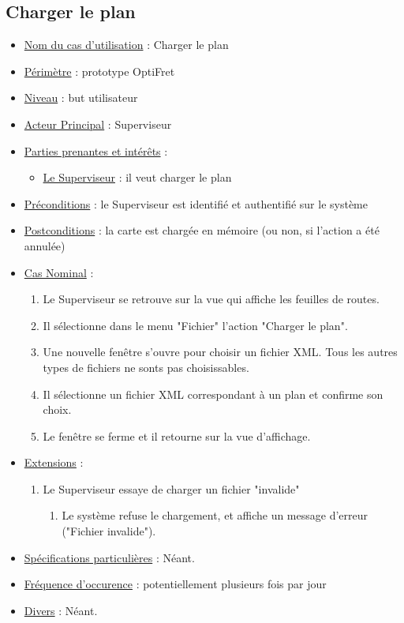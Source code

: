 \documentclass[a4paper]{report}
\begin{document}
\subsection{Charger le plan}
\begin{itemize}[label = \textbullet, font = \color{orange}]
    \item \underline{Nom du cas d'utilisation} : Charger le plan
    \item \underline{Périmètre} : prototype OptiFret
    \item \underline{Niveau} : but utilisateur
    \item \underline{Acteur Principal} : Superviseur
    \item \underline{Parties prenantes et intérêts} :
    \begin{itemize}[label = \textbullet, font = \color{blue}]
        \item \underline{Le Superviseur} : il veut charger le plan
    \end{itemize}
    \item \underline{Préconditions} : le Superviseur est identifié et
        authentifié sur le système
    \item \underline{Postconditions} : la carte est chargée en mémoire (ou non,
        si l'action a été annulée)
    \item \underline{Cas Nominal} :
        \begin{enumerate}
            \item Le Superviseur se retrouve sur la vue qui affiche les
                feuilles de routes.
            \item Il sélectionne dans le menu "Fichier" l'action "Charger le
                plan".
            \item Une nouvelle fenêtre s'ouvre pour choisir un fichier XML.
                Tous les autres types de fichiers ne sonts pas choisissables.
            \item Il sélectionne un fichier XML correspondant à un plan et
                confirme son choix.
            \item Le fenêtre se ferme et il retourne sur la vue d'affichage.
        \end{enumerate}
    \item \underline{Extensions} :
    \begin{enumerate}
        \item Le Superviseur essaye de charger un fichier "invalide"
        \begin{enumerate}
            \item Le système refuse le chargement, et affiche un message
                d'erreur ("Fichier invalide").
        \end{enumerate}
    \end{enumerate}
    \item \underline{Spécifications particulières} : Néant.
    \item \underline{Fréquence d'occurence} : potentiellement plusieurs fois
        par jour
    \item \underline{Divers} : Néant.
\end{itemize}
\end{document}
